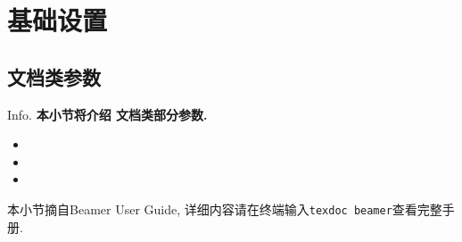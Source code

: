 \section{基础设置}
\subsection{ 文档类参数}
\begin{frame}{Info.}
	\textbf{本小节将介绍  文档类部分参数.}
	\begin{multicols}{2}
		\begin{itemize}
			\item {}
			\item {}
			\item {}
		\end{itemize}
	\end{multicols}
	\vspace{2ex}本小节摘自\textcolor{univgreen}{Beamer User Guide}, 详细内容请在终端输入\alert{\texttt{texdoc beamer}}查看完整手册.
\end{frame}

